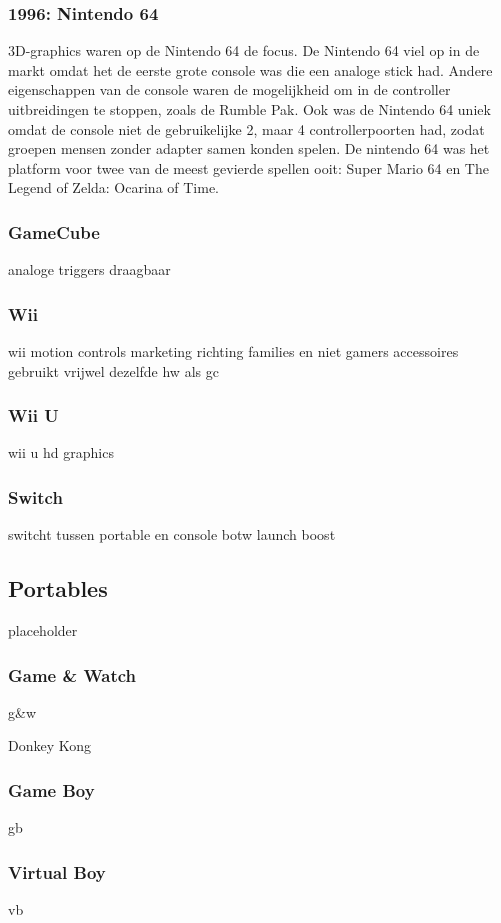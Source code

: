 \documentclass{article}
\begin{document}
\subsubsection{1996: Nintendo 64}
3D-graphics waren op de Nintendo 64 de focus. De Nintendo 64 viel op in de markt omdat het de eerste grote console was die een analoge stick had. Andere eigenschappen van de console waren de mogelijkheid om in de controller uitbreidingen te stoppen, zoals de Rumble Pak. Ook was de Nintendo 64 uniek omdat de console niet de gebruikelijke 2, maar 4 controllerpoorten had, zodat groepen mensen zonder adapter samen konden spelen. De nintendo 64 was het platform voor twee van de meest gevierde spellen ooit: Super Mario 64 en The Legend of Zelda: Ocarina of Time. 

\subsubsection{GameCube}
analoge triggers
draagbaar


\subsubsection{Wii}
wii
motion controls
marketing richting families en niet gamers
accessoires
gebruikt vrijwel dezelfde hw als gc

\subsubsection{Wii U}
wii u
hd graphics

\subsubsection{Switch}
switcht tussen portable en console
botw launch boost 
\subsection{Portables}
placeholder
\subsubsection{Game \& Watch}
g\&w

Donkey Kong
\subsubsection{Game Boy}
gb
\subsubsection{Virtual Boy}
vb
\end{document}
